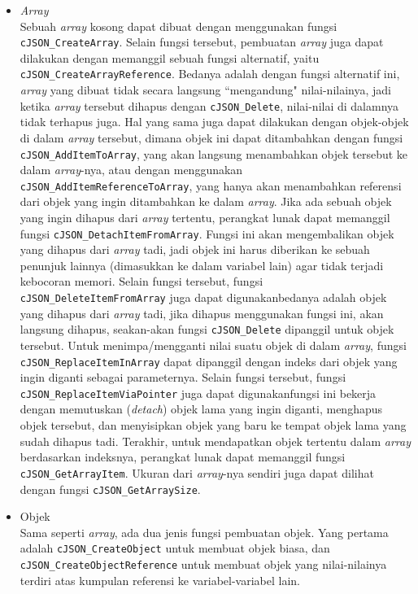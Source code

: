 \begin{itemize}
	\item \textit{Array}\\
	Sebuah \textit{array} kosong dapat dibuat dengan menggunakan fungsi \verb|cJSON_CreateArray|. Selain fungsi tersebut, pembuatan \textit{array} juga dapat dilakukan dengan memanggil sebuah fungsi alternatif, yaitu \verb|cJSON_CreateArrayReference|. Bedanya adalah dengan fungsi alternatif ini, \textit{array} yang dibuat tidak secara langsung ``mengandung" nilai-nilainya, jadi ketika \textit{array} tersebut dihapus dengan \verb|cJSON_Delete|, nilai-nilai di dalamnya tidak terhapus juga. Hal yang sama juga dapat dilakukan dengan objek-objek di dalam \textit{array} tersebut, dimana objek ini dapat ditambahkan dengan fungsi \verb|cJSON_AddItemToArray|, yang akan langsung menambahkan objek tersebut ke dalam \textit{array}-nya, atau dengan menggunakan \verb|cJSON_AddItemReferenceToArray|, yang hanya akan menambahkan referensi dari objek yang ingin ditambahkan ke dalam \textit{array}.
	Jika ada sebuah objek yang ingin dihapus dari \textit{array} tertentu, perangkat lunak dapat memanggil fungsi \verb|cJSON_DetachItemFromArray|. Fungsi ini akan mengembalikan objek yang dihapus dari \textit{array} tadi, jadi objek ini harus diberikan ke sebuah penunjuk lainnya (dimasukkan ke dalam variabel lain) agar tidak terjadi kebocoran memori. Selain fungsi tersebut, fungsi \verb|cJSON_DeleteItemFromArray| juga dapat digunakan\textemdash bedanya adalah objek yang dihapus dari \textit{array} tadi, jika dihapus menggunakan fungsi ini, akan langsung dihapus, seakan-akan fungsi \verb|cJSON_Delete| dipanggil untuk objek tersebut.
	Untuk menimpa/mengganti nilai suatu objek di dalam \textit{array}, fungsi \verb|cJSON_ReplaceItemIn|\linebreak \verb|Array| dapat dipanggil dengan indeks dari objek yang ingin diganti sebagai parameternya. Selain fungsi tersebut, fungsi \verb|cJSON_ReplaceItemViaPointer| juga dapat digunakan\textemdash fungsi ini bekerja dengan memutuskan (\textit{detach}) objek lama yang ingin diganti, menghapus objek tersebut, dan menyisipkan objek yang baru ke tempat objek lama yang sudah dihapus tadi.
	Terakhir, untuk mendapatkan objek tertentu dalam \textit{array} berdasarkan indeksnya, perangkat lunak dapat memanggil fungsi \verb|cJSON_GetArrayItem|. Ukuran dari \textit{array}-nya sendiri juga dapat dilihat dengan fungsi \verb|cJSON_GetArraySize|.
	\item Objek\\	
	Sama seperti \textit{array}, ada dua jenis fungsi pembuatan objek. Yang pertama adalah \verb|cJSON_CreateObject| untuk membuat objek biasa, dan \verb|cJSON_CreateObjectReference| untuk membuat objek yang nilai-nilainya terdiri atas kumpulan referensi ke variabel-variabel lain.

\end{itemize}
